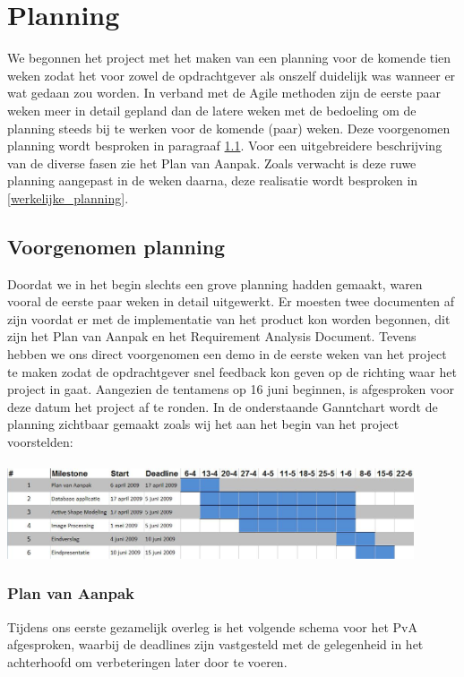 \section{Planning}
\label{Planning}
We begonnen het project met het maken van een planning voor de komende tien
weken zodat het voor zowel de opdrachtgever als onszelf duidelijk was wanneer
er wat gedaan zou worden. In verband met de Agile methoden zijn de eerste paar
weken meer in detail gepland dan de latere weken met de bedoeling om de
planning steeds bij te werken voor de komende (paar) weken. Deze voorgenomen
planning wordt besproken in paragraaf \ref{voorgenomen_planning}. Voor een
uitgebreidere beschrijving van de diverse fasen zie het Plan van Aanpak.
Zoals verwacht is deze ruwe planning aangepast in de
weken daarna, deze realisatie wordt besproken in \ref{werkelijke_planning}.

\subsection{Voorgenomen planning}
\label{voorgenomen_planning}
Doordat we in het begin slechts een grove planning hadden gemaakt, waren vooral
de eerste paar weken in detail uitgewerkt.
Er moesten twee documenten af zijn voordat er met de implementatie van het product kon worden begonnen, dit zijn het Plan van Aanpak en het Requirement Analysis Document.
Tevens hebben we ons direct voorgenomen een demo in de eerste weken van het project te maken zodat de opdrachtgever snel feedback kon geven op de richting waar het project in gaat.
Aangezien de tentamens op 16 juni beginnen, is afgesproken voor deze datum het project af te ronden.
In de onderstaande Ganntchart wordt de planning zichtbaar gemaakt zoals wij het aan het begin van het project voorstelden:
\\
\\
\includegraphics[width=0.9\textwidth]{ganntbefore}

\subsubsection{Plan van Aanpak}
Tijdens ons eerste gezamelijk overleg is het volgende schema voor het PvA
afgesproken, waarbij de deadlines zijn vastgesteld met de gelegenheid in het achterhoofd om verbeteringen later door te voeren.

